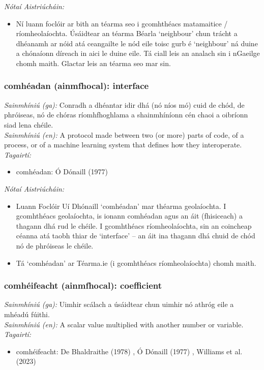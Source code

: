 \documentclass{article}
\begin{document}
 \noindent \textit{Nótaí Aistriúcháin:}
\begin{itemize}
	\item Ní luann foclóir ar bith an téarma seo i gcomhthéacs matamaitice / ríomheolaíochta. Úsáidtear an téarma Béarla `neighbour' chun trácht a dhéanamh ar nóid atá ceangailte le nód eile toisc gurb é `neighbour' ná duine a chónaíonn díreach in aici le duine eile. Tá ciall leis an analach sin i nGaeilge chomh maith. Glactar leis an téarma seo mar sin.
\end{itemize}


\subsubsection*{comhéadan (ainmfhocal): interface}
 \noindent \textit{Sainmhíniú (ga):} Conradh a dhéantar idir dhá (nó níos mó) cuid de chód, de phróiseas, nó de chóras ríomhfhoghlama a shainmhíníonn cén chaoi a oibríonn siad lena chéile.
\\
 \noindent \textit{Sainmhíniú (en):} A protocol made between two (or more) parts of code, of a process, or of a machine learning system that defines how they interoperate.
\\
 \noindent \textit{Tagairtí:}
\begin{itemize}
	\item comhéadan: Ó Dónaill (1977) \cite{odonaill}
\end{itemize}

 \noindent \textit{Nótaí Aistriúcháin:}
\begin{itemize}
	\item Luann Foclóir Uí Dhónaill `comhéadan' mar théarma geolaíochta. I gcomhthéacs geolaíochta, is ionann comhéadan agus an áit (fhisiceach) a thagann dhá rud le chéile. I gcomhthéacs ríomheolaíochta, sin an coincheap céanna atá taobh thiar de `interface' -- an áit ina thagann dhá chuid de chód nó de phróiseas le chéile.
	\item Tá `comhéadan' ar Téarma.ie (i gcomhthéacs ríomheolaíochta) chomh maith.
\end{itemize}


\subsubsection*{comhéifeacht (ainmfhocal): coefficient}
 \noindent \textit{Sainmhíniú (ga):} Uimhir scálach a úsáidtear chun uimhir nó athróg eile a mhéadú fúithi.
\\
 \noindent \textit{Sainmhíniú (en):} A scalar value multiplied with another number or variable.
\\
 \noindent \textit{Tagairtí:}
\begin{itemize}
	\item comhéifeacht: De Bhaldraithe (1978) \cite{de-bhaldraithe}, Ó Dónaill (1977) \cite{odonaill}, Williams et al. (2023) \cite{storchiste}
\end{itemize}
\end{document}
